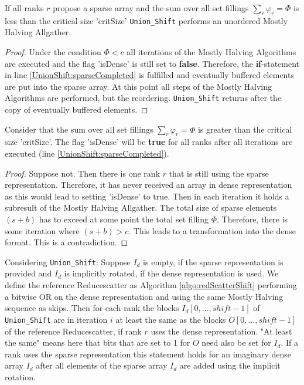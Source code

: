 \begin{corollary}\label{coro:UnionSparse}
	If all ranks $r$ propose a sparse array and the sum over all set fillings $\sum_r\varphi_r=\Phi$ is less than the critical size 'critSize' \texttt{Union\_Shift} performs an unordered Mostly Halving Allgather.
\end{corollary}
\begin{proof}
	Under the condition $\Phi<c$ all iterations of the Mostly Halving Algorithms are executed and the flag 'isDense' is still set to \textbf{false}. Therefore, the \textbf{if}-statement in line \ref{UnionShift:sparseCompleted} is fulfilled and eventually buffered elements are put into the sparse array. At this point all steps of the Mostly Halving Algorithms are performed, but the reordering. \texttt{Union\_Shift} returns after the copy of eventually buffered elements.
\end{proof}
\begin{corollary}
	Consider that the sum over all set fillings $\sum_r\varphi_r=\Phi$ is greater than the critical size 'critSize'. The flag 'isDense' will be \textbf{true} for all ranks after all iterations are executed (line \ref{UnionShift:sparseCompleted}).
\end{corollary}
\begin{proof}
	Suppose not. Then there is one rank $r$ that is still using the sparse representation. Therefore, it has never received an array in dense representation as this would lead to setting 'isDense' to true. Then in each iteration it holds a  subresult of the Mostly Halving Allgather. The total size of sparse elements $(s + b)$ has to exceed at some point the total set filling $\Phi$. Therefore, there is some iteration where $(s + b) > c$. This leads to a transformation into the dense format. This is a contradiction.
\end{proof}
\begin{lemma}
	Considering \texttt{Union\_Shift}: Suppose $I_d$ is empty, if the sparse representation is provided and $I_d$ is implicitly rotated, if the dense representation is used. We define the reference Reducescatter as Algorithm \ref{algo:redScatterShift} performing a bitwise OR on the dense representation and using the same Mostly Halving sequence as skips. Then for each rank the blocks $I_d[0,\dots, shift-1]$ of \texttt{Union\_Shift} are in iteration $i$ at least the same as the blocks $O[0,\dots, shift-1]$ of the reference Reducescatter, if rank $r$ uses the dense representation. "At least the same" means here that bits that are set to 1 for $O$ need also be set for $I_d$. If a rank uses the sparse representation this statement holds for an imaginary dense array $I_d$  after all elements of the sparse array $I_d$ are added using the implicit rotation.
\end{lemma}
